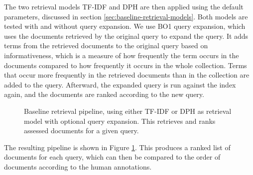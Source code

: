 The two retrieval models TF-IDF and DPH are then applied using the default parameters, discussed in section \ref{sec:baseline-retrieval-models}.
Both models are tested with and without query expansion.
We use BO1 query expansion, which uses the documents retrieved by the original query to expand the query.
It adds terms from the retrieved documents to the original query based on informativeness, which is a measure of how frequently the term occurs in the documents compared to how frequently it occurs in the whole collection.
Terms that occur more frequently in the retrieved documents than in the collection are added to the query.
Afterward, the expanded query is run against the index again, and the documents are ranked according to the new query.
\begin{figure}[tb]
\caption{Baseline retrieval pipeline, using either TF-IDF or DPH as retrieval model with optional query expansion. This retrieves and ranks assessed documents for a given query.}
\label{fig:baseline-pipeline}
\end{figure}
The resulting pipeline is shown in Figure \ref{fig:baseline-pipeline}.
This produces a ranked list of documents for each query, which can then be compared to the order of documents according to the human annotations.

